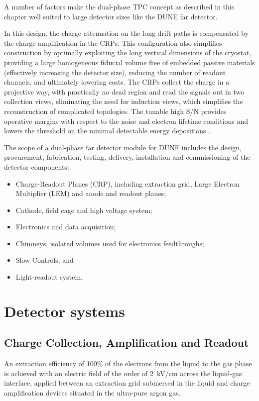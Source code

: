 A number of factors make the dual-phase TPC concept as described in this chapter 
well suited to large detector sizes like the DUNE far detector.

In this design, the charge attenuation on the long drift paths is compensated by the
charge amplification in the CRPs.  This configuration also simplifies
construction by optimally exploiting the long vertical dimensions of
the cryostat, providing a large homogeneous fiducial volume 
free of embedded passive materials (effectively increasing the detector size),
reducing the number of readout channels,  and ultimately lowering costs.  
The CRPs collect the charge in a projective way,  with practically no dead region and read the signals out 
in two collection views, eliminating the need for  induction views, which 
simplifies the reconstruction of complicated topologies. The tunable high S/N provides operative margins
with respect to the noise and electron lifetime conditions and lowers the threshold on the minimal
detectable energy depositions .

The scope of a dual-phase far detector module for DUNE includes the design,
procurement, fabrication, testing, delivery, installation and
commissioning of the detector components:
\begin{itemize}
\item Charge-Readout Planes (CRP), including extraction grid, Large Electron Multiplier (LEM) and anode and readout planes;
\item Cathode, field cage and high voltage system;  
\item Electronics and data acquisition; 
\item Chimneys, isolated volumes used for electronics feedthroughs;  
\item Slow Controls; and
\item Light-readout system.
\end{itemize}

\section{Detector systems}
\label{sec:fddp-ov-systems}
\subsection{Charge Collection, Amplification and Readout}

An extraction efficiency of 100\% of the electrons from the liquid to
the gas phase is achieved with an electric field of the order of
2~kV/cm across the liquid-gas interface, applied between an 
extraction grid submersed in the liquid and charge amplification 
devices situated in the ultra-pure argon gas. 

